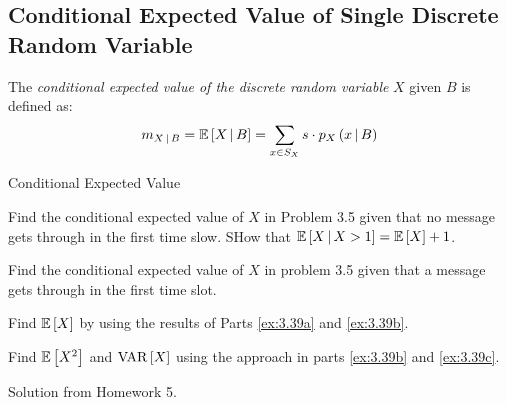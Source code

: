 \subsection{Conditional Expected Value of Single Discrete Random Variable}\label{subsec:Conditional Expected Value of Single Discrete}
\begin{definition}\label{def:Conditional Expected Value of Single Discrete}
  The \emph{conditional expected value of the discrete random variable} $X$ given $B$ is defined as:
  \begin{equation}\label{eq:Conditional Expected Value of Single Discrete}
    m_{X \operatorname{\vert} B} = \operatorname{\operatorname{\mathbb{E}}} \left[ X \operatorname{\vert} B \right] = \sum\limits_{x \in S_{X}} s \cdot p_{X} \left( x \operatorname{\vert} B \right)
  \end{equation}
\end{definition}
\begin{example}[Problem 3.39]{Conditional Expected Value}
  \begin{boldalphlist}
  \item Find the conditional expected value of $X$ in Problem 3.5 given that no message gets through in the first time slow. SHow that $\operatorname{\operatorname{\mathbb{E}}} \left[ X \operatorname{\vert} X>1 \right] = \operatorname{\operatorname{\mathbb{E}}} \left[ X \right] + 1$.\label{ex:3.39a}
  \item Find the conditional expected value of $X$ in problem 3.5 given that a message gets through in the first time slot.\label{ex:3.39b}
  \item Find $\operatorname{\operatorname{\mathbb{E}}} \left[ X \right]$ by using the results of Parts \ref{ex:3.39a} and \ref{ex:3.39b}.\label{ex:3.39c}
  \item Find $\operatorname{\operatorname{\mathbb{E}}} \left[ X^{2} \right]$ and $\operatorname{\operatorname{VAR}} \left[ X \right]$ using the approach in parts \ref{ex:3.39b} and \ref{ex:3.39c}.
  \end{boldalphlist}

  \tcblower

  Solution from Homework 5.
\end{example}

